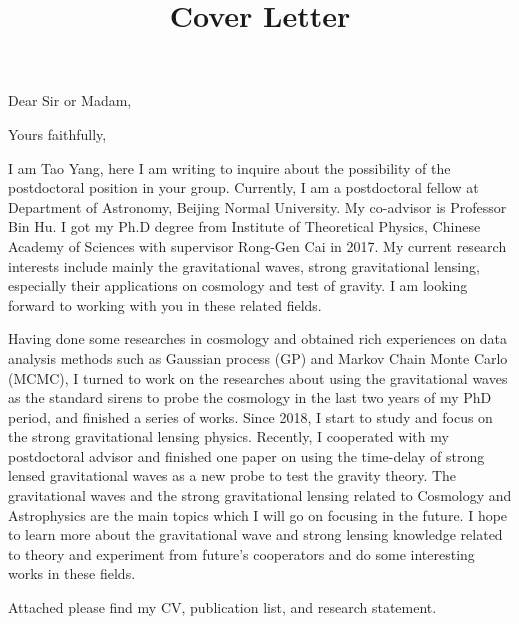 \documentclass[11pt,letterpaper,sans]{moderncv}   %
\title{Cover Letter}
\begin{document}
\opening{Dear Sir or Madam,}
\closing{Yours faithfully,}
\makelettertitle

I am Tao Yang, here I am writing to inquire about the possibility of the postdoctoral position in your group. Currently, I am a postdoctoral fellow at Department of Astronomy, Beijing Normal University. My co-advisor is Professor Bin Hu.  I got my Ph.D degree from Institute of Theoretical Physics, Chinese
Academy of Sciences  with supervisor Rong-Gen Cai in 2017. My current research interests include mainly the gravitational waves, strong gravitational lensing, especially their applications on cosmology and test of gravity. I am looking forward to working with you in these related fields.

Having done some researches in cosmology and obtained rich experiences on data analysis methods such as
Gaussian process (GP) and Markov Chain Monte Carlo (MCMC), I turned to work on the researches about
using the gravitational waves as the standard sirens to probe the cosmology in the last two years of my PhD
period, and finished a series of works. Since 2018, I start to study and focus on the strong gravitational lensing physics. Recently, I cooperated with my
postdoctoral advisor and finished one paper on using the time-delay of strong lensed gravitational waves as a
new probe to test the gravity theory. The gravitational waves and the strong gravitational lensing related to
Cosmology and Astrophysics are the main topics which I will go on focusing in the future. I hope to learn more about the gravitational wave and strong lensing
knowledge related to theory and experiment from future’s cooperators and do some interesting works in these
fields.

Attached please find my CV, publication list, and research statement. 


\vspace{10mm}

\makeletterclosing
\end{document}
